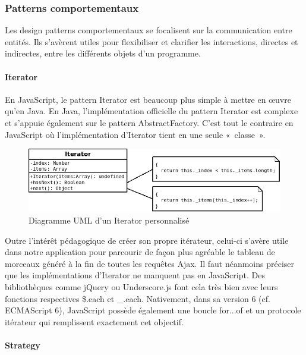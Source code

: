 \documentclass[a4paper,12pt]{article}
\begin{document}
\subsubsection{Patterns comportementaux}

Les design patterns comportementaux se focalisent sur la communication entre entités. Ils s'avèrent utiles pour flexibiliser et clarifier les interactions, directes et indirectes, entre les différents objets d'un programme.

\paragraph{Iterator}

En JavaScript, le pattern Iterator est beaucoup plus simple à mettre en œuvre qu'en Java. En Java, l'implémentation officielle du pattern Iterator est complexe et s'appuie également sur le pattern AbstractFactory. C'est tout le contraire en JavaScript où l'implémentation d'Iterator tient en une seule «~classe~».

\begin{figure}[!h]
  \begin{center}
    \includegraphics[scale=0.5]{Iterator.png}
    \caption{Diagramme UML d'un Iterator personnalisé}
  \end{center}
\end{figure}

Outre l'intérêt pédagogique de créer son propre itérateur, celui-ci s'avère utile dans notre application pour parcourir de façon plus agréable le tableau de morceaux généré à la fin de toutes les requêtes Ajax. Il faut néanmoins préciser que les implémentations d'Iterator ne manquent pas en JavaScript. Des bibliothèques comme jQuery ou Underscore.js font cela très bien avec leurs fonctions respectives \$.each et \_.each. Nativement, dans sa version 6 (cf. ECMAScript 6), JavaScript possède également une boucle for...of et un protocole itérateur qui remplissent exactement cet objectif.

\paragraph{Strategy}
\end{document}
